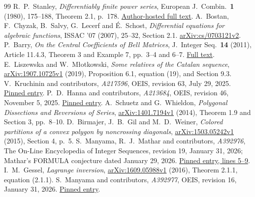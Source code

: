 \documentclass[10pt]{article}
\begin{document}
\begin{thebibliography}{99}
R.\ P.\ Stanley, \emph{Differentiably finite power series},
European J.\ Combin.\ \textbf{1} (1980), 175--188, Theorem 2.1, p.\ 178.
\href{https://math.mit.edu/~rstan/pubs/pubfiles/45.pdf}{Author-hosted full text}.
A.\ Bostan, F.\ Chyzak, B.\ Salvy, G.\ Lecerf and \'E.\ Schost,
\emph{Differential equations for algebraic functions}, ISSAC '07 (2007),
25--32, Section 2.1.
\href{https://arxiv.org/abs/cs/0703121v2}{arXiv:cs/0703121v2}.
P.\ Barry, \emph{On the Central Coefficients of Bell Matrices},
J.\ Integer Seq.\ \textbf{14} (2011), Article 11.4.3,
Theorem 3 and Example 7, pp.\ 3--4 and 6--7.
\href{https://cs.uwaterloo.ca/journals/JIS/VOL14/Barry3/barry132.pdf}{Full text}.
E.\ Liszewska and W.\ M\l{}otkowski, \emph{Some relatives of the Catalan sequence},
\href{https://arxiv.org/abs/1907.10725v1}{arXiv:1907.10725v1} (2019),
Proposition 6.1, equation (19), and Section 9.3.
V.\ Kruchinin and contributors, \emph{A217596}, OEIS, revision 63,
July 29, 2025.
\href{https://github.com/oeis/oeisdata/blob/4c6abcdf8b00fd262030066ebfced671457e5b43/seq/A217/A217596.seq}{Pinned entry}.
P.\ D.\ Hanna and contributors, \emph{A213684}, OEIS, revision 46,
November 5, 2025.
\href{https://github.com/oeis/oeisdata/blob/4c6abcdf8b00fd262030066ebfced671457e5b43/seq/A213/A213684.seq}{Pinned entry}.
A.\ Schuetz and G.\ Whieldon, \emph{Polygonal Dissections and Reversions of Series},
\href{https://arxiv.org/abs/1401.7194v1}{arXiv:1401.7194v1} (2014),
Theorem 1.9 and Section 3, pp.\ 8--10.
D.\ Birmajer, J.\ B.\ Gil and M.\ D.\ Weiner,
\emph{Colored partitions of a convex polygon by noncrossing diagonals},
\href{https://arxiv.org/abs/1503.05242v1}{arXiv:1503.05242v1} (2015),
Section 4, p.\ 5.
S.\ Manyama, R.\ J.\ Mathar and contributors,
\emph{A392976}, The On-Line Encyclopedia of Integer Sequences,
revision 19, January 31, 2026; Mathar's FORMULA conjecture dated January 29, 2026.
\href{https://github.com/oeis/oeisdata/blob/4c6abcdf8b00fd262030066ebfced671457e5b43/seq/A392/A392976.seq}{Pinned entry, lines 5--9}.
I.\ M.\ Gessel, \emph{Lagrange inversion},
\href{https://arxiv.org/abs/1609.05988v1}{arXiv:1609.05988v1} (2016),
Theorem 2.1.1, equation (2.1.1).
S.\ Manyama and contributors, \emph{A392977}, OEIS,
revision 16, January 31, 2026.
\href{https://github.com/oeis/oeisdata/blob/4c6abcdf8b00fd262030066ebfced671457e5b43/seq/A392/A392977.seq}{Pinned entry}.

\end{thebibliography}
\end{document}

